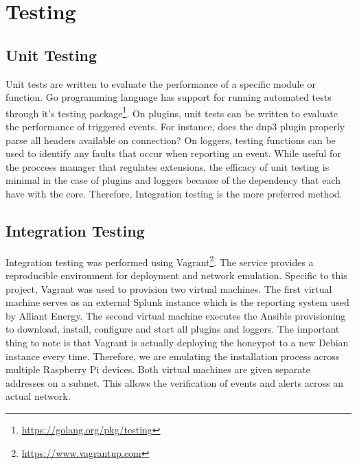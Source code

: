 \chapter{Testing}
\section{Unit Testing}

Unit tests are written to evaluate the performance of a specific module or function. Go programming language has support for running automated tests through it's testing package\footnote{\url{https://golang.org/pkg/testing}}. On plugins, unit tests can be written to evaluate the performance of triggered events. For instance, does the dnp3 plugin properly parse all headers available on connection? On loggers, testing functions can be used to identify any faults that occur when reporting an event. While useful for the proccess manager that regulates extensions, the efficacy of unit testing is minimal in the case of plugins and loggers because of the dependency that each have with the core. Therefore, Integration testing is the more preferred method. 


\section{Integration Testing}

Integration testing was performed using Vagrant\footnote{\url{https://www.vagrantup.com}}. The service provides a reproducible environment for deployment and network emulation. Specific to this project, Vagrant was used to provision two virtual machines. The first virtual machine serves as an external Splunk instance which is the reporting system used by Alliant Energy. The second virtual machine executes the Ansible provisioning to download, install, configure and start all plugins and loggers. The important thing to note is that Vagrant is actually deploying the honeypot to a new Debian instance every time. Therefore, we are emulating the installation process across multiple Raspberry Pi devices. Both virtual machines are given separate addresses on a subnet. This allows the verification of events and alerts across an actual network.
